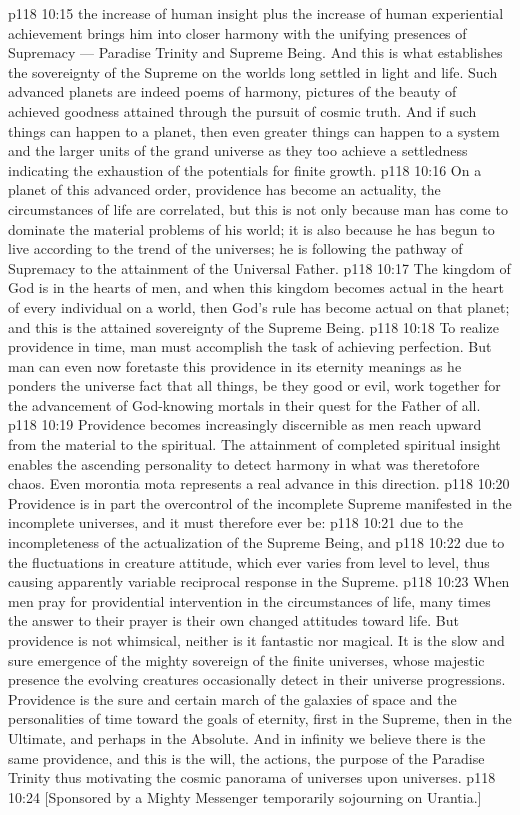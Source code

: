 \vs p118 10:15 \bibnobreakspace {} the increase of human insight plus the increase of human experiential achievement brings him into closer harmony with the unifying presences of Supremacy --- Paradise Trinity and Supreme Being. And this is what establishes the sovereignty of the Supreme on the worlds long settled in light and life. Such advanced planets are indeed poems of harmony, pictures of the beauty of achieved goodness attained through the pursuit of cosmic truth. And if such things can happen to a planet, then even greater things can happen to a system and the larger units of the grand universe as they too achieve a settledness indicating the exhaustion of the potentials for finite growth.
\vs p118 10:16 \pc On a planet of this advanced order, providence has become an actuality, the circumstances of life are correlated, but this is not only because man has come to dominate the material problems of his world; it is also because he has begun to live according to the trend of the universes; he is following the pathway of Supremacy to the attainment of the Universal Father.
\vs p118 10:17 \pc The kingdom of God is in the hearts of men, and when this kingdom becomes actual in the heart of every individual on a world, then God’s rule has become actual on that planet; and this is the attained sovereignty of the Supreme Being.
\vs p118 10:18 To realize providence in time, man must accomplish the task of achieving perfection. But man can even now foretaste this providence in its eternity meanings as he ponders the universe fact that all things, be they good or evil, work together for the advancement of God\hyp{}knowing mortals in their quest for the Father of all.
\vs p118 10:19 \pc Providence becomes increasingly discernible as men reach upward from the material to the spiritual. The attainment of completed spiritual insight enables the ascending personality to detect harmony in what was theretofore chaos. Even morontia mota represents a real advance in this direction.
\vs p118 10:20 Providence is in part the overcontrol of the incomplete Supreme manifested in the incomplete universes, and it must therefore ever be:
\vs p118 10:21 \bibnobreakspace {} due to the incompleteness of the actualization of the Supreme Being, and
\vs p118 10:22 \bibnobreakspace {} due to the fluctuations in creature attitude, which ever varies from level to level, thus causing apparently variable reciprocal response in the Supreme.
\vs p118 10:23 \pc When men pray for providential intervention in the circumstances of life, many times the answer to their prayer is their own changed attitudes toward life. But providence is not whimsical, neither is it fantastic nor magical. It is the slow and sure emergence of the mighty sovereign of the finite universes, whose majestic presence the evolving creatures occasionally detect in their universe progressions. Providence is the sure and certain march of the galaxies of space and the personalities of time toward the goals of eternity, first in the Supreme, then in the Ultimate, and perhaps in the Absolute. And in infinity we believe there is the same providence, and this is the will, the actions, the purpose of the Paradise Trinity thus motivating the cosmic panorama of universes upon universes.
\vsetoff
\vs p118 10:24 [Sponsored by a Mighty Messenger temporarily sojourning on Urantia.]
\quizlink
